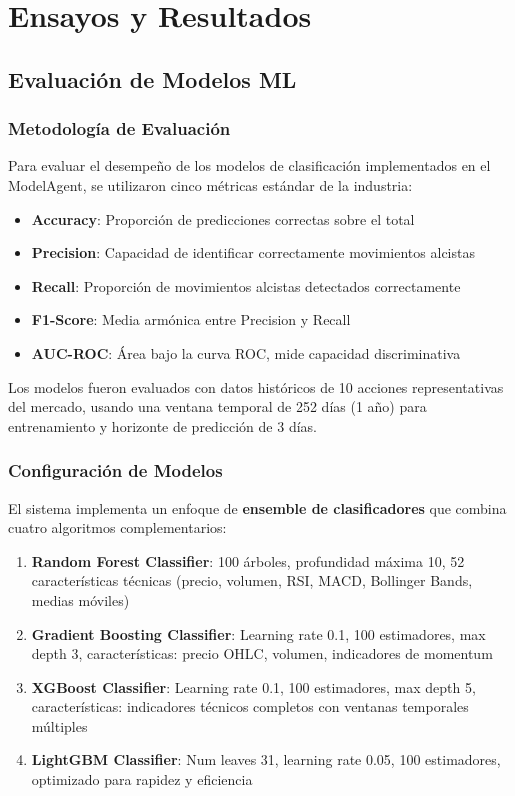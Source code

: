 \chapter{Ensayos y Resultados}

\section{Evaluación de Modelos ML}

\subsection{Metodología de Evaluación}

Para evaluar el desempeño de los modelos de clasificación implementados en el ModelAgent, se utilizaron cinco métricas estándar de la industria:

\begin{itemize}
    \item \textbf{Accuracy}: Proporción de predicciones correctas sobre el total
    \item \textbf{Precision}: Capacidad de identificar correctamente movimientos alcistas
    \item \textbf{Recall}: Proporción de movimientos alcistas detectados correctamente
    \item \textbf{F1-Score}: Media armónica entre Precision y Recall
    \item \textbf{AUC-ROC}: Área bajo la curva ROC, mide capacidad discriminativa
\end{itemize}

Los modelos fueron evaluados con datos históricos de 10 acciones representativas del mercado, usando una ventana temporal de 252 días (1 año) para entrenamiento y horizonte de predicción de 3 días.

\subsection{Configuración de Modelos}

El sistema implementa un enfoque de \textbf{ensemble de clasificadores} que combina cuatro algoritmos complementarios:

\begin{enumerate}
    \item \textbf{Random Forest Classifier}: 100 árboles, profundidad máxima 10, 52 características técnicas (precio, volumen, RSI, MACD, Bollinger Bands, medias móviles)

    \item \textbf{Gradient Boosting Classifier}: Learning rate 0.1, 100 estimadores, max depth 3, características: precio OHLC, volumen, indicadores de momentum

    \item \textbf{XGBoost Classifier}: Learning rate 0.1, 100 estimadores, max depth 5, características: indicadores técnicos completos con ventanas temporales múltiples

    \item \textbf{LightGBM Classifier}: Num leaves 31, learning rate 0.05, 100 estimadores, optimizado para rapidez y eficiencia
\end{enumerate}


